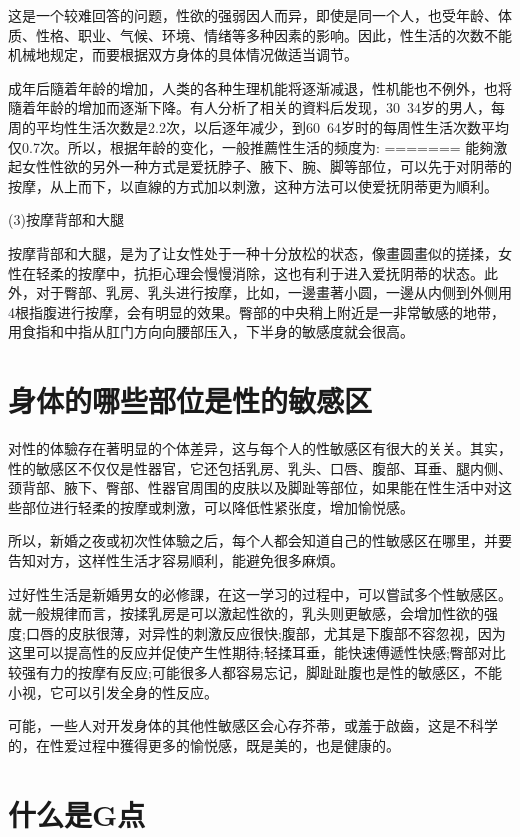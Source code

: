 \documentclass[12pt,UTF8]{ctexbook}
\begin{document}
这是一个较难回答的问题，性欲的强弱因人而异，即使是同一个人，也受年龄、体质、性格、职业、气候、环境、情绪等多种因素的影响。因此，性生活的次数不能机械地规定，而要根据双方身体的具体情况做适当调节。

成年后隨着年龄的增加，人类的各种生理机能将逐渐减退，性机能也不例外，也将隨着年龄的增加而逐渐下降。有人分析了相关的資料后发现，30~34岁的男人，每周的平均性生活次数是2.2次，以后逐年减少，到60~64岁时的每周性生活次数平均仅0.7次。所以，根据年龄的变化，一般推薦性生活的频度为:
=======
能夠激起女性性欲的另外一种方式是爱抚脖子、腋下、腕、脚等部位，可以先于对阴蒂的按摩，从上而下，以直線的方式加以刺激，这种方法可以使爱抚阴蒂更为順利。

(3)按摩背部和大腿

按摩背部和大腿，是为了让女性处于一种十分放松的状态，像畫圆畫似的搓揉，女性在轻柔的按摩中，抗拒心理会慢慢消除，这也有利于进入爱抚阴蒂的状态。此外，对于臀部、乳房、乳头进行按摩，比如，一邊畫著小圆，一邊从内侧到外侧用4根指腹进行按摩，会有明显的效果。臀部的中央稍上附近是一非常敏感的地带，用食指和中指从肛门方向向腰部压入，下半身的敏感度就会很高。

\section{身体的哪些部位是性的敏感区}

对性的体驗存在著明显的个体差异，这与每个人的性敏感区有很大的关关。其实，性的敏感区不仅仅是性器官，它还包括乳房、乳头、口唇、腹部、耳垂、腿内侧、颈背部、腋下、臀部、性器官周围的皮肤以及脚趾等部位，如果能在性生活中对这些部位进行轻柔的按摩或刺激，可以降低性紧张度，增加愉悦感。

所以，新婚之夜或初次性体驗之后，每个人都会知道自己的性敏感区在哪里，并要告知对方，这样性生活才容易順利，能避免很多麻煩。

过好性生活是新婚男女的必修課，在这一学习的过程中，可以嘗試多个性敏感区。就一般規律而言，按揉乳房是可以激起性欲的，乳头则更敏感，会增加性欲的强度;口唇的皮肤很薄，对异性的刺激反应很快;腹部，尤其是下腹部不容忽视，因为这里可以提高性的反应并促使产生性期待;轻揉耳垂，能快速傅遞性快感;臀部对比较强有力的按摩有反应;可能很多人都容易忘记，脚趾趾腹也是性的敏感区，不能小视，它可以引发全身的性反应。

可能，一些人对开发身体的其他性敏感区会心存芥蒂，或羞于啟齒，这是不科学的，在性爱过程中獲得更多的愉悦感，既是美的，也是健康的。

\section{什么是G点}
\end{document}
